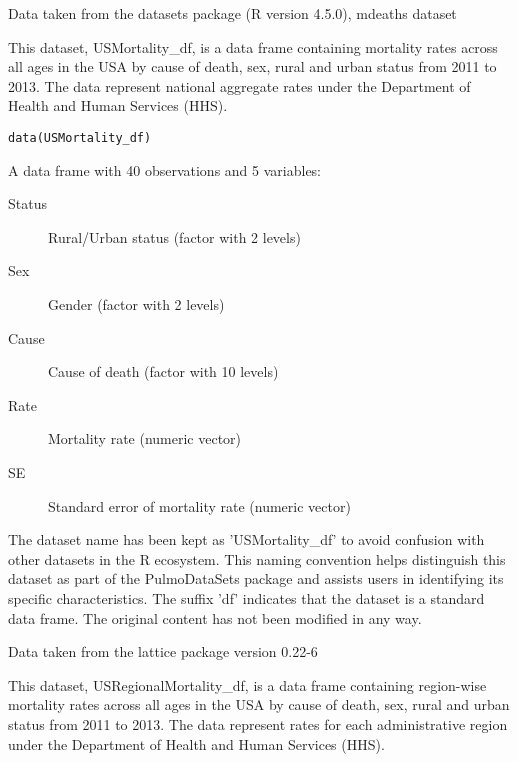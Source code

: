 \documentclass[a4paper]{book}
\begin{document}
%
\begin{Source}
Data taken from the datasets package (R version 4.5.0), mdeaths dataset
\end{Source}
%
\begin{Description}
This dataset, USMortality\_df, is a data frame containing mortality rates across all ages
in the USA by cause of death, sex, rural and urban status from 2011 to 2013. The data
represent national aggregate rates under the Department of Health and Human Services (HHS).
\end{Description}
%
\begin{Usage}
\begin{verbatim}
data(USMortality_df)
\end{verbatim}
\end{Usage}
%
\begin{Format}
A data frame with 40 observations and 5 variables:
\begin{description}

\item[Status] Rural/Urban status (factor with 2 levels)
\item[Sex] Gender (factor with 2 levels)
\item[Cause] Cause of death (factor with 10 levels)
\item[Rate] Mortality rate (numeric vector)
\item[SE] Standard error of mortality rate (numeric vector)

\end{description}

\end{Format}
%
\begin{Details}
The dataset name has been kept as 'USMortality\_df' to avoid confusion with other datasets
in the R ecosystem. This naming convention helps distinguish this dataset as part of the
PulmoDataSets package and assists users in identifying its specific characteristics.
The suffix 'df' indicates that the dataset is a standard data frame. The original content has not been modified
in any way.
\end{Details}
%
\begin{Source}
Data taken from the lattice package version 0.22-6
\end{Source}
%
\begin{Description}
This dataset, USRegionalMortality\_df, is a data frame containing region-wise mortality rates
across all ages in the USA by cause of death, sex, rural and urban status from 2011 to 2013.
The data represent rates for each administrative region under the Department of Health and Human Services (HHS).
\end{Description}
\end{document}
